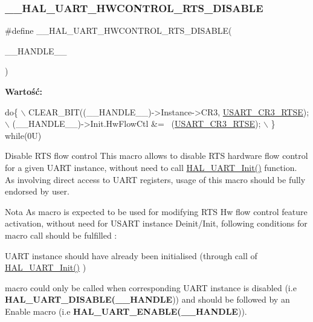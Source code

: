 \subsubsection{\texorpdfstring{\+\_\+\+\_\+\+H\+A\+L\+\_\+\+U\+A\+R\+T\+\_\+\+H\+W\+C\+O\+N\+T\+R\+O\+L\+\_\+\+R\+T\+S\+\_\+\+D\+I\+S\+A\+B\+LE}{\_\_HAL\_UART\_HWCONTROL\_RTS\_DISABLE}}
{\footnotesize\ttfamily \#define \+\_\+\+\_\+\+H\+A\+L\+\_\+\+U\+A\+R\+T\+\_\+\+H\+W\+C\+O\+N\+T\+R\+O\+L\+\_\+\+R\+T\+S\+\_\+\+D\+I\+S\+A\+B\+LE(\begin{DoxyParamCaption}\item[{}]{\+\_\+\+\_\+\+H\+A\+N\+D\+L\+E\+\_\+\+\_\+ }\end{DoxyParamCaption})}

{\bfseries Wartość\+:}
\begin{DoxyCode}
\textcolor{keywordflow}{do}\{                                                      \(\backslash\)
    CLEAR\_BIT((\_\_HANDLE\_\_)->Instance->CR3, \hyperlink{group___peripheral___registers___bits___definition_ga7c5d6fcd84a4728cda578a0339b4cac2}{USART\_CR3\_RTSE});\(\backslash\)
    (\_\_HANDLE\_\_)->Init.HwFlowCtl &= ~(\hyperlink{group___peripheral___registers___bits___definition_ga7c5d6fcd84a4728cda578a0339b4cac2}{USART\_CR3\_RTSE});     \(\backslash\)
  \} \textcolor{keywordflow}{while}(0U)
\end{DoxyCode}


Disable R\+TS flow control This macro allows to disable R\+TS hardware flow control for a given U\+A\+RT instance, without need to call \hyperlink{group___u_a_r_t___exported___functions___group1_gabe47045024787099b0bfa82bbe7b0b6a}{H\+A\+L\+\_\+\+U\+A\+R\+T\+\_\+\+Init()} function. As involving direct access to U\+A\+RT registers, usage of this macro should be fully endorsed by user. 

\begin{DoxyNote}{Nota}
As macro is expected to be used for modifying R\+TS Hw flow control feature activation, without need for U\+S\+A\+RT instance Deinit/\+Init, following conditions for macro call should be fulfilled \+:
\begin{DoxyItemize}
\item U\+A\+RT instance should have already been initialised (through call of \hyperlink{group___u_a_r_t___exported___functions___group1_gabe47045024787099b0bfa82bbe7b0b6a}{H\+A\+L\+\_\+\+U\+A\+R\+T\+\_\+\+Init()} )
\item macro could only be called when corresponding U\+A\+RT instance is disabled (i.\+e {\bfseries H\+A\+L\+\_\+\+U\+A\+R\+T\+\_\+\+D\+I\+S\+A\+B\+LE(\+\_\+\+\_\+\+H\+A\+N\+D\+LE})) and should be followed by an Enable macro (i.\+e {\bfseries H\+A\+L\+\_\+\+U\+A\+R\+T\+\_\+\+E\+N\+A\+B\+LE(\+\_\+\+\_\+\+H\+A\+N\+D\+LE})). 
\end{DoxyItemize}
\end{DoxyNote}


